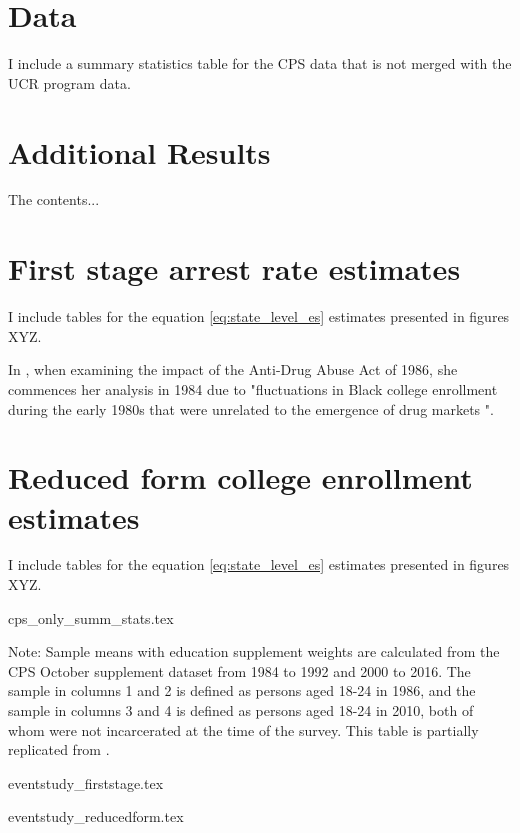 \documentclass{article}
\begin{document}
\clearpage



\clearpage



\clearpage



\clearpage

\begin{appendices}
  \section{Data}
  I include a summary statistics table for the CPS data that is not merged with the UCR program data.

  \section{Additional Results}
  The contents...
  \section{First stage arrest rate estimates}
  I include tables for the equation \ref{eq:state_level_es} estimates presented in figures XYZ.


  In \cite{britton2022}, when examining the impact of the Anti-Drug Abuse Act of 1986, she commences her analysis in 1984 due to "fluctuations in Black college enrollment during the early 1980s that were unrelated to the emergence of drug markets \cite{nces}".

 

  \section{Reduced form college enrollment estimates}
  I include tables for the equation \ref{eq:state_level_es} estimates presented in figures XYZ.


  \clearpage

  
  
  \clearpage

  {cps_only_summ_stats.tex}
  \begin{footnotesize}
    \noindent Note: Sample means with education supplement weights are calculated from the CPS October supplement dataset from 1984 to 1992 and 2000 to 2016. The sample in columns 1 and 2 is defined as persons aged 18-24 in 1986, and the sample in columns 3 and 4 is defined as persons aged 18-24 in 2010, both of whom were not incarcerated at the time of the survey. This table is partially replicated from \cite{britton2022}.
  \end{footnotesize}
  \clearpage
  {eventstudy_firststage.tex}

  \clearpage

  {eventstudy_reducedform.tex}


\end{appendices}
\end{document}
